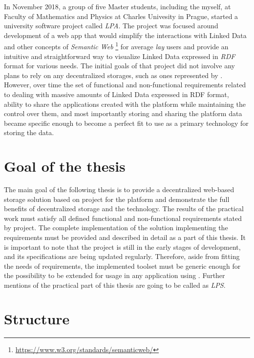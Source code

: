 In November 2018, a group of five Master students, including the myself, at Faculty of Mathematics and Physics at Charles Univesity in Prague, started a university software project called \textit{\gls{LPA}}. The project was focused around development of a web app that would simplify the interactions with Linked Data and other concepts of \textit{Semantic Web} \footnote{\url{https://www.w3.org/standards/semanticweb/}} for average \textit{lay} users and provide an intuitive and straightforward way to visualize Linked Data expressed in \textit{RDF} format for various needs. The initial goals of that project did not involve any plans to rely on any decentralized storages, such as ones represented by \solid{}. However, over time the set of functional and non-functional requirements related to dealing with massive amounts of Linked Data expressed in RDF format, ability to share the applications created with the platform while maintaining the control over them, and most importantly storing and sharing the \lpa{} platform data became specific enough to become a perfect fit to use \solid{} as a primary technology for storing the data. 
 
\section*{Goal of the thesis}
The main goal of the following thesis is to provide a decentralized web-based storage solution based on \solid{} project for the \lpa{} platform and demonstrate the full benefits of decentralized storage and the \solid{} technology. The results of the practical work must satisfy all defined functional and non-functional requirements stated by \lpa{} project. The complete implementation of the solution implementing the requirements must be provided and described in detail as a part of this thesis. It is important to note that the \solid{} project is still in the early stages of development, and its specifications are being updated regularly. Therefore, aside from fitting the needs of \lpa{} requirements, the implemented toolset must be generic enough for the possibility to be extended for usage in any application using \solid{}. Further mentions of the practical part of this thesis are going to be called as \textit{\gls{LPS}}.

\section*{Structure}

